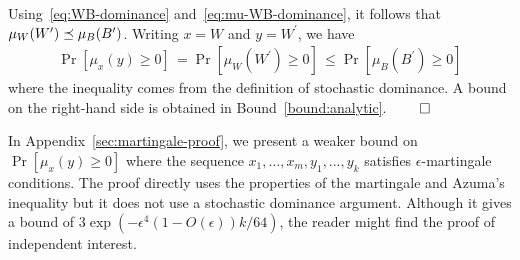 Using~\eqref{eq:WB-dominance} and~\eqref{eq:mu-WB-dominance}, 
it follows that $\mu_W(W^\prime) \preceq \mu_{B}(B^\prime)$. 
Writing $x = W$ and $y = W^\prime$, we have 
\begin{align*}
  \Pr[\mu_x(y) \geq 0]\, 
    = \Pr[\mu_W(W^\prime) \geq 0]\, 
    \leq \Pr[\mu_{B}(B^\prime) \geq 0]
\end{align*}
where the inequality comes from the definition of stochastic dominance. 
A bound on the right-hand side 
is obtained in Bound~\ref{bound:analytic}. 
\hfill $\qed$






In Appendix~\ref{sec:martingale-proof}, 
we present a weaker bound 
on $\Pr[\mu_x(y) \geq 0]$ where the sequence 
$x_1, \ldots, x_m, y_1, \ldots, y_k$ satisfies $\epsilon$-martingale conditions. 
The proof directly uses the properties of the martingale 
and Azuma's inequality  but 
it does not use a stochastic dominance argument. 
Although it gives a bound of $3 \exp\left( -\epsilon^4 (1 - O(\epsilon) ) k/64 \right)$, 
the reader might find the proof of independent interest. 


